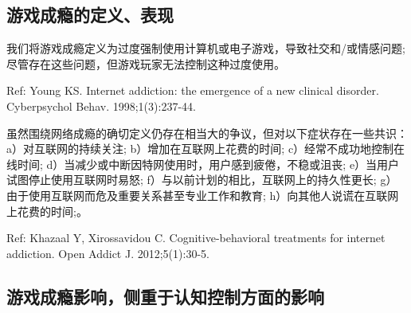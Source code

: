 \subsection{游戏成瘾的定义、表现}

我们将游戏成瘾定义为过度强制使用计算机或电子游戏，导致社交和/或情感问题; 尽管存在这些问题，但游戏玩家无法控制这种过度使用。

Ref: Young KS. Internet addiction: the emergence of a new clinical disorder. Cyberpsychol Behav. 1998;1(3):237-44. 


虽然围绕网络成瘾的确切定义仍存在相当大的争议，但对以下症状存在一些共识：a）对互联网的持续关注; b）增加在互联网上花费的时间; c）经常不成功地控制在线时间; d）当减少或中断因特网使用时，用户感到疲倦，不稳或沮丧; e）当用户试图停止使用互联网时易怒; f）与以前计划的相比，互联网上的持久性更长; g）由于使用互联网而危及重要关系甚至专业工作和教育; h）向其他人说谎在互联网上花费的时间;。


Ref: Khazaal Y, Xirossavidou C. Cognitive-behavioral treatments for internet addiction. Open Addict J. 2012;5(1):30-5.




\subsection{游戏成瘾影响，侧重于认知控制方面的影响}

